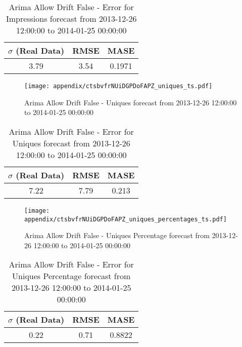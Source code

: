 \begin{table}[H]
\centering
\footnotesize
\begin{tabular}{ccc}
$\sigma$ (Real Data) & RMSE & MASE   \\ \hline
3.79 & 3.54 & 0.1971 \\
\end{tabular}

\vspace{0.5cm}

\caption{
Arima Allow Drift False - Error for Impressions forecast from 2013-12-26 12:00:00 to 2014-01-25 00:00:00}
\end{table}

\begin{figure}[H] \begin{center} \leavevmode
\texttt{[image: appendix/ctsbvfrNUiDGPDoFAPZ\_uniques\_ts.pdf]} \caption{
Arima Allow Drift False - Uniques forecast from 2013-12-26 12:00:00 to 2014-01-25 00:00:00} \label{fig:appendix/ctsbvfrNUiDGPDoFAPZ_uniques_ts.pdf} \end{center}
\end{figure}

\begin{table}[H]
\centering
\footnotesize
\begin{tabular}{ccc}
$\sigma$ (Real Data) & RMSE & MASE   \\ \hline
7.22 & 7.79 & 0.213 \\
\end{tabular}

\vspace{0.5cm}

\caption{
Arima Allow Drift False - Error for Uniques forecast from 2013-12-26 12:00:00 to 2014-01-25 00:00:00}
\end{table}

\begin{figure}[H] \begin{center} \leavevmode
\texttt{[image: appendix/ctsbvfrNUiDGPDoFAPZ\_uniques\_percentages\_ts.pdf]} \caption{
Arima Allow Drift False - Uniques Percentage forecast from 2013-12-26 12:00:00 to 2014-01-25 00:00:00} \label{fig:appendix/ctsbvfrNUiDGPDoFAPZ_uniques_percentages_ts.pdf} \end{center}
\end{figure}

\begin{table}[H]
\centering
\footnotesize
\begin{tabular}{ccc}
$\sigma$ (Real Data) & RMSE & MASE   \\ \hline
0.22 & 0.71 & 0.8822 \\
\end{tabular}

\vspace{0.5cm}

\caption{
Arima Allow Drift False - Error for Uniques Percentage forecast from 2013-12-26 12:00:00 to 2014-01-25 00:00:00}
\end{table}

